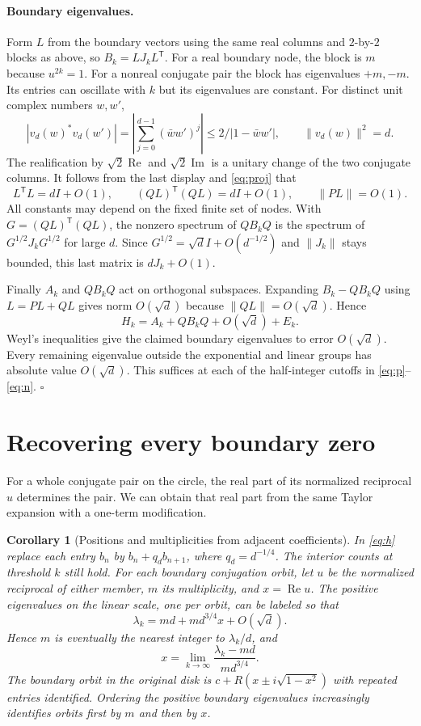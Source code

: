 \documentclass[11pt]{article}
\newtheorem{corollary}[theorem]{Corollary}
\newcommand{\tr}{^{\mathsf T}}
\newcommand{\norm}[1]{\lVert #1\rVert}
\begin{document}
\paragraph{Boundary eigenvalues.}
Form $L$ from the boundary vectors using the same real columns and $2$-by-$2$ blocks as above, so $B_k=L J_k L\tr$. For a real boundary node, the block is $m$ because $u^{2k}=1$. For a nonreal conjugate pair the block has eigenvalues $+m,-m$. Its entries can oscillate with $k$ but its eigenvalues are constant. For distinct unit complex numbers $w,w'$,
\[
 |v_d(w)^*v_d(w')|=\left|\sum_{j=0}^{d-1}(\bar w w')^j\right|
 \le 2/|1-\bar w w'|,\qquad \norm{v_d(w)}^2=d.
\]
The realification by $\sqrt2\operatorname{Re}$ and $\sqrt2\operatorname{Im}$ is a unitary change of the two conjugate columns. It follows from the last display and \eqref{eq:proj} that
\[
 L\tr L=dI+O(1),\qquad (QL)\tr(QL)=dI+O(1),\qquad \norm{PL}=O(1).
\]
All constants may depend on the fixed finite set of nodes. With $G=(QL)\tr(QL)$, the nonzero spectrum of $QB_kQ$ is the spectrum of $G^{1/2}J_kG^{1/2}$ for large $d$. Since $G^{1/2}=\sqrt d I+O(d^{-1/2})$ and $\norm{J_k}$ stays bounded, this last matrix is $d J_k+O(1)$.

Finally $A_k$ and $QB_kQ$ act on orthogonal subspaces. Expanding $B_k-QB_kQ$ using $L=PL+QL$ gives norm $O(\sqrt d)$ because $\norm{QL}=O(\sqrt d)$. Hence
\[
 H_k=A_k+QB_kQ+O(\sqrt d)+E_k.
\]
Weyl's inequalities give the claimed boundary eigenvalues to error $O(\sqrt d)$. Every remaining eigenvalue outside the exponential and linear groups has absolute value $O(\sqrt d)$. This suffices at each of the half-integer cutoffs in \eqref{eq:p}--\eqref{eq:n}. \hfill$\square$

\section{Recovering every boundary zero}
For a whole conjugate pair on the circle, the real part of its normalized reciprocal $u$ determines the pair. We can obtain that real part from the same Taylor expansion with a one-term modification.

\begin{corollary}[Positions and multiplicities from adjacent coefficients]\label{cor:angle}
In \eqref{eq:h} replace each entry $b_n$ by $b_n+q_d b_{n+1}$, where $q_d=d^{-1/4}$. The interior counts at threshold $k$ still hold. For each boundary conjugation orbit, let $u$ be the normalized reciprocal of either member, $m$ its multiplicity, and $x=\operatorname{Re}u$. The positive eigenvalues on the linear scale, one per orbit, can be labeled so that
\begin{equation}
 \lambda_k=md + m d^{3/4}x+O(\sqrt d).
 \label{eq:angle}
\end{equation}
Hence $m$ is eventually the nearest integer to $\lambda_k/d$, and
\[
 x=\lim_{k\to\infty} \frac{\lambda_k-md}{m d^{3/4}}.
\]
The boundary orbit in the original disk is $c+R(x\pm i\sqrt{1-x^2})$ with repeated entries identified. Ordering the positive boundary eigenvalues increasingly identifies orbits first by $m$ and then by $x$.
\end{corollary}
\end{document}
